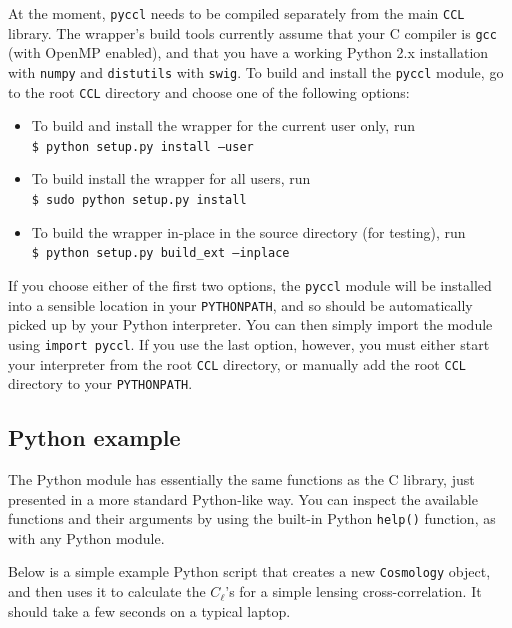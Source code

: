 \documentclass[\docopts]{\docclass}
\begin{document}
At the moment, {\tt pyccl} needs to be compiled separately from the main {\tt CCL} library. The wrapper's build tools currently assume that your C compiler is {\tt gcc} (with OpenMP enabled), and that you have a working Python 2.x installation with {\tt numpy} and {\tt distutils} with {\tt swig}. To build and install the {\tt pyccl} module, go to the root {\tt CCL} directory and choose one of the following options:
\begin{itemize}
 \item To build and install the wrapper for the current user only, run \\
 {\tt \$ python setup.py install --user}
 \item To build install the wrapper for all users, run \\
 {\tt \$ sudo python setup.py install}
 \item To build the wrapper in-place in the source directory (for testing), run \\
 {\tt \$ python setup.py build\_ext --inplace}
\end{itemize}
If you choose either of the first two options, the {\tt pyccl} module will be installed into a sensible location in your {\tt PYTHONPATH}, and so should be automatically picked up by your Python interpreter. You can then simply import the module using {\tt import pyccl}. If you use the last option, however, you must either start your interpreter from the root {\tt CCL} directory, or manually add the root {\tt CCL} directory to your {\tt PYTHONPATH}.

\subsection{Python example}
\label{sec:python:example}

The Python module has essentially the same functions as the C library, just presented in a more standard Python-like way. You can inspect the available functions and their arguments by using the built-in Python {\tt help()} function, as with any Python module.

Below is a simple example Python script that creates a new {\tt Cosmology} object, and then uses it to calculate the $C_\ell$'s for a simple lensing cross-correlation. It should take a few seconds on a typical laptop.
\end{document}
